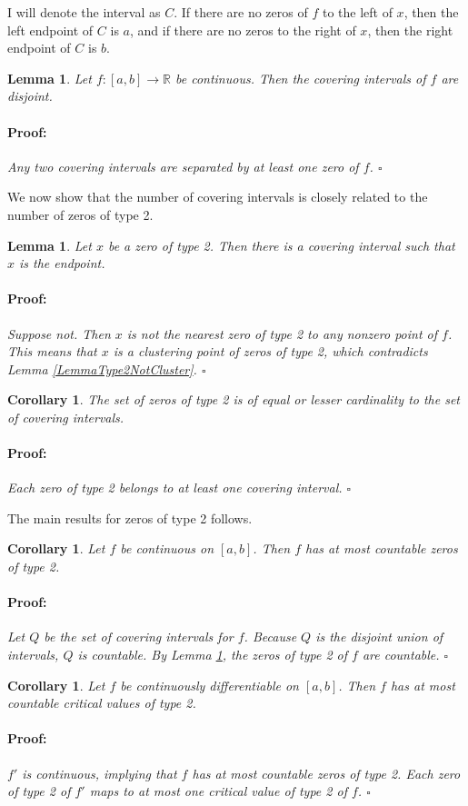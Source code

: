 \documentclass{article}
\newenvironment{proof}{\paragraph{Proof:}}{\hfill$\square$}
\newtheorem{lemma}[theorem]{Lemma}
\newtheorem{corollary}[theorem]{Corollary}
\newcommand{\R}{\mathbb{R}}
\begin{document}
I will denote the interval as $C$. If there are no zeros of $f$ to the left of $x$, then the left endpoint of $C$ is $a$, and if there are no zeros to the right of $x$, then the right endpoint of $C$ is $b$.

\begin{lemma}
Let $f: [a, b] \rightarrow \R$ be continuous. Then the covering intervals of $f$ are disjoint.
\begin{proof}
Any two covering intervals are separated by at least one zero of $f$.
\end{proof}
\end{lemma}

We now show that the number of covering intervals is closely related to the number of zeros of type 2.

\begin{lemma}
Let $x$ be a zero of type 2. Then there is a covering interval such that $x$ is the endpoint. 
\begin{proof}
Suppose not. Then $x$ is not the nearest zero of type 2 to any nonzero point of $f$. This means that $x$ is a clustering point of zeros of type 2, which contradicts Lemma \ref{LemmaType2NotCluster}.
\end{proof}
\end{lemma}

\begin{corollary}
\label{CorollaryZeroType2Cardinality}
The set of zeros of type 2 is of equal or lesser cardinality to the set of covering intervals.
\begin{proof}
Each zero of type 2 belongs to at least one covering interval.
\end{proof}
\end{corollary}

The main results for zeros of type 2 follows.

\begin{corollary}
Let $f$ be continuous on $[a, b]$. Then $f$ has at most countable zeros of type 2.
\begin{proof}
Let $Q$ be the set of covering intervals for $f$. Because $Q$ is the disjoint union of intervals, $Q$ is countable. By Lemma \ref{CorollaryZeroType2Cardinality}, the zeros of type 2 of $f$ are countable.
\end{proof}
\end{corollary}

\begin{corollary}
Let $f$ be continuously differentiable on $[a, b]$. Then $f$ has at most countable critical values of type 2.
\begin{proof}
$f'$ is continuous, implying that $f$ has at most countable zeros of type 2. Each zero of type 2 of $f'$ maps to at most one critical value of type 2 of $f$.
\end{proof}
\end{corollary}
\end{document}
